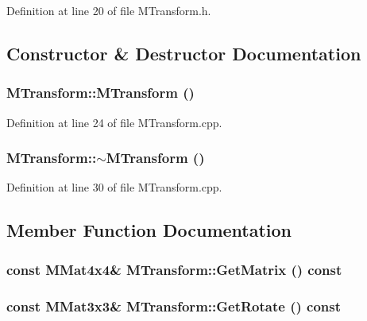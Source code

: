 Definition at line 20 of file MTransform.h.

\subsection{Constructor \& Destructor Documentation}
\hypertarget{class_m_transform_bd1c3dd3a80e286f0e6ffd17def8a557}{
\subsubsection[{MTransform}]{\setlength{\rightskip}{0pt plus 5cm}MTransform::MTransform ()}}
\label{class_m_transform_bd1c3dd3a80e286f0e6ffd17def8a557}




Definition at line 24 of file MTransform.cpp.\hypertarget{class_m_transform_c9aa57f7524bcb418dcad3b4d79c34b8}{
\subsubsection[{$\sim$MTransform}]{\setlength{\rightskip}{0pt plus 5cm}MTransform::$\sim$MTransform ()}}
\label{class_m_transform_c9aa57f7524bcb418dcad3b4d79c34b8}




Definition at line 30 of file MTransform.cpp.

\subsection{Member Function Documentation}
\hypertarget{class_m_transform_15ca5661a8c5eebcc52eaedf0e656363}{
\subsubsection[{GetMatrix}]{\setlength{\rightskip}{0pt plus 5cm}const {\bf MMat4x4}\& MTransform::GetMatrix () const}}
\label{class_m_transform_15ca5661a8c5eebcc52eaedf0e656363}


\hypertarget{class_m_transform_53ce8dc029fa701a72791d21d8ed33a9}{
\subsubsection[{GetRotate}]{\setlength{\rightskip}{0pt plus 5cm}const {\bf MMat3x3}\& MTransform::GetRotate () const}}
\label{class_m_transform_53ce8dc029fa701a72791d21d8ed33a9}




